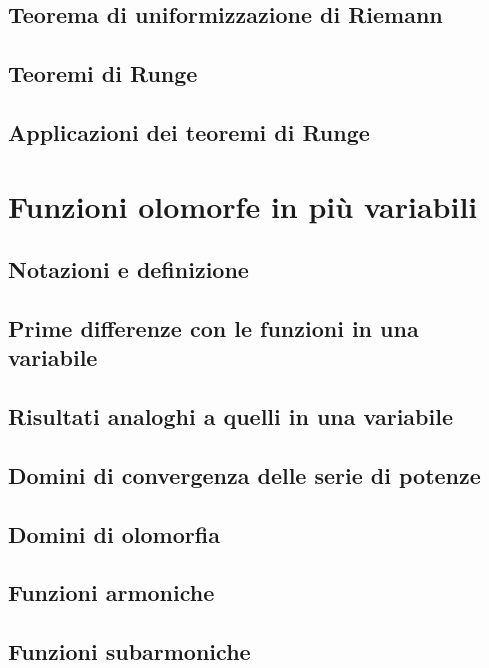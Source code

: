 \documentclass{article}
\begin{document}
\subsection{Teorema di uniformizzazione di Riemann}


\subsection{Teoremi di Runge}


\subsection{Applicazioni dei teoremi di Runge}


\newpage

\section{Funzioni olomorfe in più variabili}

\subsection{Notazioni e definizione}


\subsection{Prime differenze con le funzioni in una variabile}


\subsection{Risultati analoghi a quelli in una variabile}


\subsection{Domini di convergenza delle serie di potenze}


\subsection{Domini di olomorfia}


\subsection{Funzioni armoniche}


\subsection{Funzioni subarmoniche}

\end{document}
